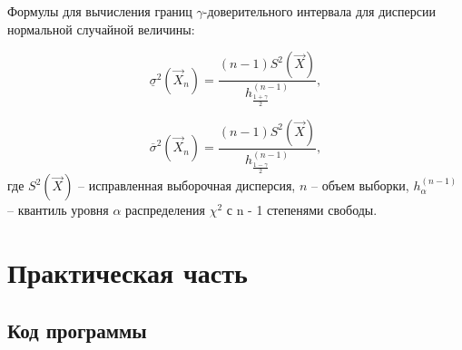 Формулы для вычисления границ $\gamma$-доверительного интервала для дисперсии нормальной случайной величины:

$$
\underline\sigma^2(\vec X_n)= \frac{(n-1)S^2(\vec X)}{h^{(n-1)}_{\frac{1+\gamma}{2}}},
$$

$$
\overline\sigma^2(\vec X_n)= \frac{(n-1)S^2(\vec X)}{h^{(n-1)}_{\frac{1-\gamma}{2}}},
$$
где $S^2(\vec X)$ -- исправленная выборочная дисперсия, $n$ -- объем выборки, $h^{(n-1)}_{\alpha}$ -- квантиль уровня $\alpha$ распределения $\chi^2$ с n - 1 степенями свободы.

\chapter{Практическая часть}

\section{Код программы}

